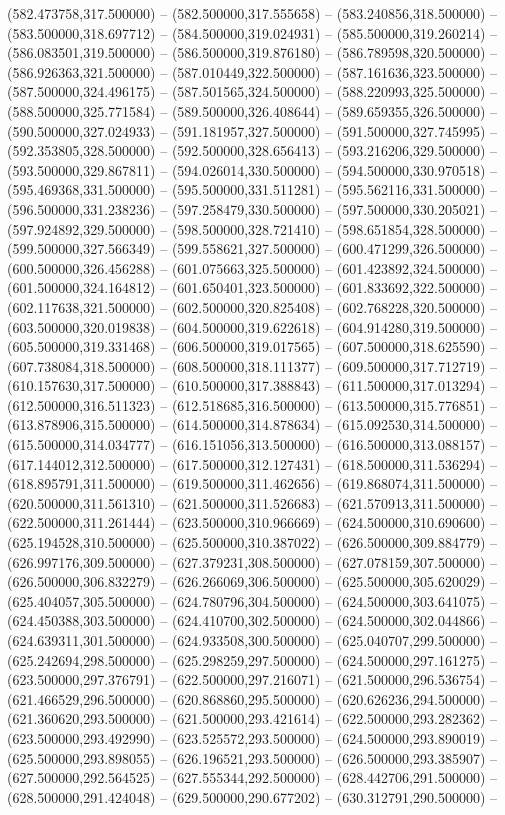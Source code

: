 (582.473758,317.500000) -- (582.500000,317.555658) -- (583.240856,318.500000) -- (583.500000,318.697712) -- (584.500000,319.024931) -- (585.500000,319.260214) -- (586.083501,319.500000) -- (586.500000,319.876180) -- (586.789598,320.500000) -- (586.926363,321.500000) -- (587.010449,322.500000) -- (587.161636,323.500000) -- (587.500000,324.496175) -- (587.501565,324.500000) -- (588.220993,325.500000) -- (588.500000,325.771584) -- (589.500000,326.408644) -- (589.659355,326.500000) -- (590.500000,327.024933) -- (591.181957,327.500000) -- (591.500000,327.745995) -- (592.353805,328.500000) -- (592.500000,328.656413) -- (593.216206,329.500000) -- (593.500000,329.867811) -- (594.026014,330.500000) -- (594.500000,330.970518) -- (595.469368,331.500000) -- (595.500000,331.511281) -- (595.562116,331.500000) -- (596.500000,331.238236) -- (597.258479,330.500000) -- (597.500000,330.205021) -- (597.924892,329.500000) -- (598.500000,328.721410) -- (598.651854,328.500000) -- (599.500000,327.566349) -- (599.558621,327.500000) -- (600.471299,326.500000) -- (600.500000,326.456288) -- (601.075663,325.500000) -- (601.423892,324.500000) -- (601.500000,324.164812) -- (601.650401,323.500000) -- (601.833692,322.500000) -- (602.117638,321.500000) -- (602.500000,320.825408) -- (602.768228,320.500000) -- (603.500000,320.019838) -- (604.500000,319.622618) -- (604.914280,319.500000) -- (605.500000,319.331468) -- (606.500000,319.017565) -- (607.500000,318.625590) -- (607.738084,318.500000) -- (608.500000,318.111377) -- (609.500000,317.712719) -- (610.157630,317.500000) -- (610.500000,317.388843) -- (611.500000,317.013294) -- (612.500000,316.511323) -- (612.518685,316.500000) -- (613.500000,315.776851) -- (613.878906,315.500000) -- (614.500000,314.878634) -- (615.092530,314.500000) -- (615.500000,314.034777) -- (616.151056,313.500000) -- (616.500000,313.088157) -- (617.144012,312.500000) -- (617.500000,312.127431) -- (618.500000,311.536294) -- (618.895791,311.500000) -- (619.500000,311.462656) -- (619.868074,311.500000) -- (620.500000,311.561310) -- (621.500000,311.526683) -- (621.570913,311.500000) -- (622.500000,311.261444) -- (623.500000,310.966669) -- (624.500000,310.690600) -- (625.194528,310.500000) -- (625.500000,310.387022) -- (626.500000,309.884779) -- (626.997176,309.500000) -- (627.379231,308.500000) -- (627.078159,307.500000) -- (626.500000,306.832279) -- (626.266069,306.500000) -- (625.500000,305.620029) -- (625.404057,305.500000) -- (624.780796,304.500000) -- (624.500000,303.641075) -- (624.450388,303.500000) -- (624.410700,302.500000) -- (624.500000,302.044866) -- (624.639311,301.500000) -- (624.933508,300.500000) -- (625.040707,299.500000) -- (625.242694,298.500000) -- (625.298259,297.500000) -- (624.500000,297.161275) -- (623.500000,297.376791) -- (622.500000,297.216071) -- (621.500000,296.536754) -- (621.466529,296.500000) -- (620.868860,295.500000) -- (620.626236,294.500000) -- (621.360620,293.500000) -- (621.500000,293.421614) -- (622.500000,293.282362) -- (623.500000,293.492990) -- (623.525572,293.500000) -- (624.500000,293.890019) -- (625.500000,293.898055) -- (626.196521,293.500000) -- (626.500000,293.385907) -- (627.500000,292.564525) -- (627.555344,292.500000) -- (628.442706,291.500000) -- (628.500000,291.424048) -- (629.500000,290.677202) -- (630.312791,290.500000) -- 